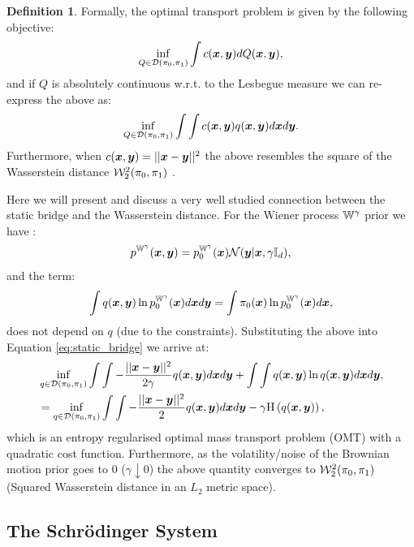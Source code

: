 \documentclass[a4paper,12pt,twoside,openright]{report}
\theoremstyle{definition}
\newtheorem{definition}{Definition}[section]
\begin{document}
\begin{definition}
Formally, the optimal transport problem is given by the following objective:
\begin{align*}
\inf_{Q \in {\mathcal{D}}(\pi_0, \pi_1)}\int  c({\bm{x}}, {\bm{y}}) dQ({\bm{x}}, {\bm{y}}),
\end{align*}
and if $Q$ is absolutely continuous w.r.t. to the Lesbegue measure we can re-express the above as:
\begin{align*}
\inf_{Q \in {\mathcal{D}}(\pi_0, \pi_1)}\int \int c({\bm{x}}, {\bm{y}}) q({\bm{x}}, {\bm{y}}) d{\bm{x}} d{\bm{y}}.
\end{align*}
Furthermore, when $ c({\bm{x}}, {\bm{y}}) = || {\bm{x}} - {\bm{y}}||^2$  the above resembles the square of the Wasserstein distance ${\mathcal{W}}^2_{2}(\pi_0, \pi_1)$ .
\end{definition}

Here we will present and discuss a very well studied \citep{mikami2008optimal,leonard2012schrodinger,leonard2013survey,carlier2017convergence} connection between the static bridge and the Wasserstein distance.  For the Wiener process $\mathbb{W}^\gamma$ prior we have :
\begin{align}
    p^{\mathbb{W}^{\gamma}}({\bm{x}},{\bm{y}}) = p^{\mathbb{W}^{\gamma}}_0({\bm{x}}){\mathcal{N}}({\bm{y}} | {\bm{x}}, \gamma{\mathbb{I}_d}),
\end{align}
and the term:
\begin{align*}
    \int q({\bm{x}}, {\bm{y}})\ln  p^{\mathbb{W}^{\gamma}}_0({\bm{x}}) d{\bm{x}} d{\bm{y}} =  \int \pi_0({\bm{x}}) \ln  p^{\mathbb{W}^{\gamma}}_0({\bm{x}}) d{\bm{x}}  ,
\end{align*}
does not depend on $q$ (due to the constraints). Substituting the above into Equation \ref{eq:static_bridge} we arrive at:
\begin{align}
    &\inf _{q \in {\mathcal{D}}(\pi_0, \pi_1)}\int \int -\frac{||{\bm{x}} - {\bm{y}} ||^2}{2\gamma} q({\bm{x}}, {\bm{y}}) d{\bm{x}} d{\bm{y}}  + \int \int q({\bm{x}}, {\bm{y}}) \ln q({\bm{x}}, {\bm{y}}) d{\bm{x}} d{\bm{y}}, \nonumber \\
    &=\inf _{q \in {\mathcal{D}}(\pi_0, \pi_1)}\int \int -\frac{||{\bm{x}} - {\bm{y}} ||^2}{2} q({\bm{x}}, {\bm{y}}) d{\bm{x}} d{\bm{y}}  - \gamma \text{H} \left(q({\bm{x}}, {\bm{y}})\right),
\end{align}
which is an entropy regularised optimal mass transport problem (OMT) \citep{villani2003topics} with a quadratic cost function. Furthermore, as the volatility/noise of the Brownian motion prior goes to 0 ($\gamma \downarrow 0$) the above quantity converges to ${\mathcal{W}}^2_{2}(\pi_0, \pi_1)$ (Squared Wasserstein distance in an $L_2$ metric space).
\subsection{The Schrödinger System}
\end{document}
